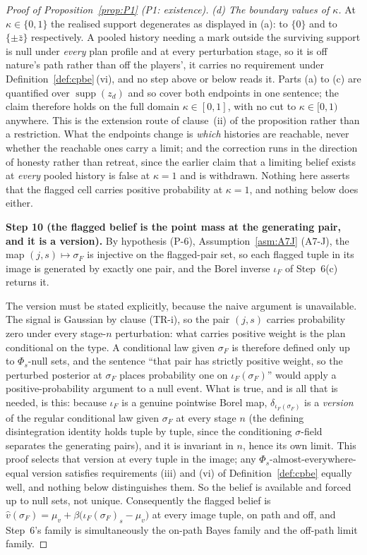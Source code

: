 \documentclass[11pt]{article}
\begin{document}
\begin{proof}[Proof of Proposition~\ref{prop:P1} (P1: existence)]
\emph{(d) The boundary values of $\kappa$.} At $\kappa \in \{0,1\}$ the realised support degenerates
as displayed in (a): to $\{0\}$ and to $\{\pm\bar z\}$ respectively. A pooled history needing a mark
outside the surviving support is null under \emph{every} plan profile and at every perturbation
stage, so it is off nature's path rather than off the players', it carries no requirement under
Definition~\ref{def:cpbe}\,(vi), and no step above or below reads it. Parts (a) to (c) are quantified
over $\operatorname{supp}(z_d)$ and so cover both endpoints in one sentence; the claim therefore
holds on the full domain $\kappa \in [0,1]$, with no cut to $\kappa \in [0,1)$ anywhere. This is the
extension route of clause~(ii) of the proposition rather than a restriction. What the endpoints
change is \emph{which} histories are reachable, never whether the reachable ones carry a limit; and
the correction runs in the direction of honesty rather than retreat, since the earlier claim that a
limiting belief exists at \emph{every} pooled history is false at $\kappa = 1$ and is withdrawn.
Nothing here asserts that the flagged cell carries positive probability at $\kappa = 1$, and nothing
below does either.

\smallskip
\noindent\textbf{Step 10 (the flagged belief is the point mass at the generating pair, and it is a
version).}
By hypothesis (P-6), Assumption~\ref{asm:A7J} (A7-J), the map $(j,s) \mapsto \sigma_F$ is injective on the
flagged-pair set, so each flagged tuple in its image is generated by exactly one pair, and the Borel
inverse $\iota_F$ of Step~6(c) returns it.

The version must be stated explicitly, because the naive argument is unavailable. The signal is
Gaussian by clause (TR-i), so the pair $(j,s)$ carries probability zero under every stage-$n$
perturbation: what carries positive weight is the plan conditional on the type. A conditional law
given $\sigma_F$ is therefore defined only up to $\Phi_s$-null sets, and the sentence ``that pair has
strictly positive weight, so the perturbed posterior at $\sigma_F$ places probability one on
$\iota_F(\sigma_F)$'' would apply a positive-probability argument to a null event. What is true, and
is all that is needed, is this: because $\iota_F$ is a genuine pointwise Borel map,
$\delta_{\iota_F(\sigma_F)}$ is a \emph{version} of the regular conditional law given $\sigma_F$ at
every stage $n$ (the defining disintegration identity holds tuple by tuple, since the conditioning
$\sigma$-field separates the generating pairs), and it is invariant in $n$, hence its own limit.
This proof selects that version at every tuple in the image; any $\Phi_s$-almost-everywhere-equal
version satisfies requirements (iii) and (vi) of Definition~\ref{def:cpbe} equally well, and nothing
below distinguishes them. So the belief is available and forced up to null sets, not unique.
Consequently the flagged belief is $\hat v(\sigma_F) = \mu_v + \beta\bigl(\iota_F(\sigma_F)_s -
\mu_v\bigr)$ at every image tuple, on path and off, and Step~6's family is simultaneously the on-path
Bayes family and the off-path limit family.


\end{proof}
\end{document}
